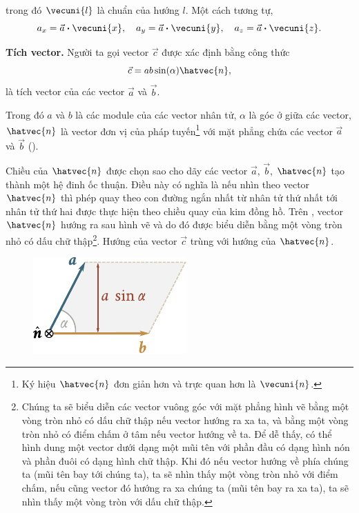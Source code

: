\noindent
trong đó $\vecuni{l}$ là chuẩn của hướng $l$. Một cách tương tự,
\begin{equation}\label{eq:1_26}
a_x = \vec{a}\boldsymbol{\cdot}\vecuni{x},\quad  a_y = \vec{a}\boldsymbol{\cdot}\vecuni{y}, \quad  a_z=\vec{a}\boldsymbol{\cdot}\vecuni{z}.
\end{equation}

\textbf{Tích vector.} Người ta gọi vector $\vec{c}$ được xác định bằng công thức
\begin{equation}\label{eq:1_27}
\vec{c} = ab\sin(\alpha)\hatvec{n},
\end{equation}
là tích vector của các vector $\vec{a}$ và $\vec{b}$.

\noindent
Trong đó $a$ và $b$ là các module của các vector nhân tử, $\alpha$ là góc ở giữa các vector, $\hatvec{n}$ là vector đơn vị của pháp tuyến\footnote{Ký hiệu $\hatvec{n}$ đơn giản hơn và trực quan hơn là $\vecuni{n}$.} với mặt phẳng chứa các vector $\vec{a}$ và $\vec{b}$ ().

Chiều của $\hatvec{n}$ được chọn sao cho dãy các vector $\vec{a}$, $\vec{b}$, $\hatvec{n}$ tạo thành một hệ đinh ốc thuận. Điều này có nghĩa là nếu nhìn theo vector $\hatvec{n}$ thì phép quay theo con đường ngắn nhất từ nhân tử thứ nhất tới nhân tử thứ hai được thực hiện theo chiều quay của kim đồng hồ. Trên , vector $\hatvec{n}$ hướng ra sau hình vẽ và do đó được biểu diễn bằng một vòng tròn nhỏ có dấu chữ thập\footnote{Chúng ta sẽ biểu diễn các vector vuông góc với mặt phẳng hình vẽ bằng một vòng tròn nhỏ có dấu chữ thập nếu vector hướng ra xa ta, và bằng một vòng tròn nhỏ có điểm chấm ở tâm nếu vector hướng về ta. Để dễ thấy, có thể hình dung một vector dưới dạng một mũi tên với phần đầu có dạng hình nón và phần đuôi có dạng hình chữ thập. Khi đó nếu vector hướng về phía chúng ta (mũi tên bay tới chúng ta), ta sẽ nhìn thấy một vòng tròn nhỏ với điểm chấm, nếu cũng vector đó hướng ra xa chúng ta (mũi tên bay ra xa ta), ta sẽ nhìn thấy một vòng tròn với dấu chữ thập.}. Hướng của vector $\vec{c}$ trùng với hướng của $\hatvec{n}$.

\begin{figure}[!htb]
	\begin{center}
		\includegraphics[scale=1]{figures/ch_01/fig_1_16.pdf}
		\caption[]{}
		\label{fig:1_16}
	\end{center}
\end{figure}

